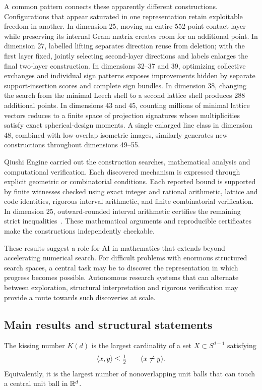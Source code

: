 A common pattern connects these apparently different constructions.
Configurations that appear saturated in one representation retain
exploitable freedom in another. In dimension 25, moving an entire
552-point contact layer while preserving its internal Gram matrix
creates room for an additional point. In dimension 27, labelled lifting
separates direction reuse from deletion; with the first layer fixed,
jointly selecting second-layer directions and labels enlarges the final
two-layer construction. In dimensions 32--37 and 39, optimizing
collective exchanges and individual sign patterns exposes improvements
hidden by separate support-insertion scores and complete sign bundles.
In dimension 38, changing the search from the minimal Leech shell to a
second lattice shell produces 288 additional points. In dimensions 43
and 45, counting millions of minimal lattice vectors reduces to a finite
space of projection signatures whose multiplicities satisfy exact
spherical-design moments. A single enlarged line class in dimension 48,
combined with low-overlap isometric images, similarly generates new
constructions throughout dimensions 49--55.

Qiushi Engine carried out the construction searches, mathematical analysis
and computational verification. Each discovered mechanism is expressed
through explicit geometric or combinatorial conditions. Each reported
bound is supported by finite witnesses checked using exact integer and
rational arithmetic, lattice and code identities, rigorous interval
arithmetic, and finite combinatorial verification. In dimension 25,
outward-rounded interval arithmetic certifies the remaining strict
inequalities~\cite{johansson-arb}. These mathematical arguments and
reproducible certificates make the constructions independently
checkable.

These results suggest a role for AI in mathematics that extends beyond
accelerating numerical search. For difficult problems with enormous
structured search spaces, a central task may be to discover the
representation in which progress becomes possible. Autonomous research
systems that can alternate between exploration, structural interpretation
and rigorous verification may provide a route towards such discoveries
at scale.

\subsection{Main results and structural statements}

The kissing number $K(d)$ is the largest cardinality of a set
$X\subset S^{d-1}$ satisfying
\begin{equation}\label{eq:kissing}
 \langle x,y\rangle\le\tfrac12\qquad(x\ne y).
\end{equation}
Equivalently, it is the largest number of nonoverlapping unit balls
that can touch a central unit ball in $\mathbb R^d$.

